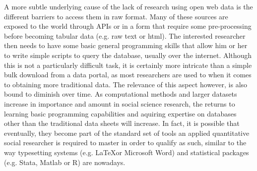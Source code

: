 \documentclass[12pt]{article}
\begin{document}
A more subtle underlying cause of the lack of research using
open web data is the different barriers to access them in raw
format. Many of these sources are exposed to the
world through APIs or in a form that require some pre-processing before
becoming tabular data (e.g. raw text or html). 
The interested researcher then needs to have some basic
general programming skills that allow him or her to write simple scripts to
query the database, usually over the internet. Although this is not a
particularly difficult task, it is certainly more intricate than a simple bulk
download from a data portal, as most researchers are used to when it comes to
obtaining more traditional data. The relevance of this aspect however, is also
bound to diminish over time. As computational methods and larger datasets
increase in importance and amount in social science research, the returns to learning basic
programming capabilities and aquiring expertise on databases other
than the traditional data sheets will increase. In fact, it is possible that eventually,
they become part of the standard set of tools an applied quantitative social researcher is
required to master in order to qualify as such, similar to the way typesetting
systems (e.g. \LaTeX  or Microsoft Word) and statistical packages
(e.g. Stata, Matlab or R) are nowadays.
\end{document}
